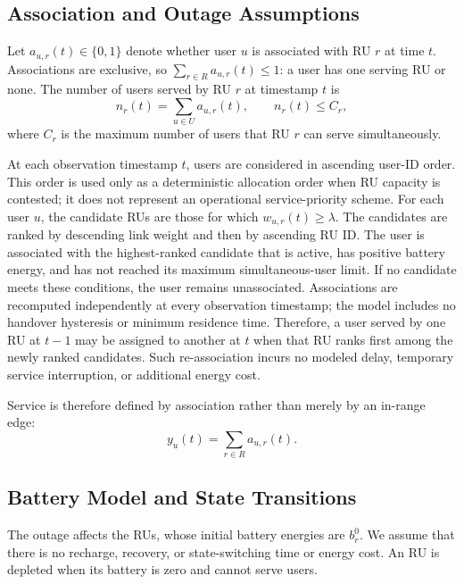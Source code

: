 \subsection{Association and Outage Assumptions}

Let \(a_{u,r}(t)\in\{0,1\}\) denote whether user \(u\) is associated with RU \(r\) at time \(t\). Associations are exclusive, so \(\sum_{r\in R}a_{u,r}(t)\leq1\): a user has one serving RU or none. The number of users served by RU \(r\) at timestamp \(t\) is
\begin{equation}
 n_r(t)=\sum_{u\in U}a_{u,r}(t), \qquad n_r(t)\leq C_r,
 \label{eq:ru-load}
\end{equation}
where \(C_r\) is the maximum number of users that RU \(r\) can serve simultaneously.

At each observation timestamp \(t\), users are considered in ascending user-ID order. This order is used only as a deterministic allocation order when RU capacity is contested; it does not represent an operational service-priority scheme. For each user \(u\), the candidate RUs are those for which \(w_{u,r}(t)\geq\lambda\). The candidates are ranked by descending link weight and then by ascending RU ID. The user is associated with the highest-ranked candidate that is active, has positive battery energy, and has not reached its maximum simultaneous-user limit. If no candidate meets these conditions, the user remains unassociated. Associations are recomputed independently at every observation timestamp; the model includes no handover hysteresis or minimum residence time. Therefore, a user served by one RU at \(t-1\) may be assigned to another at \(t\) when that RU ranks first among the newly ranked candidates. Such re-association incurs no modeled delay, temporary service interruption, or additional energy cost.

Service is therefore defined by association rather than merely by an in-range edge:
\begin{equation}
 y_u(t)=\sum_{r\in R}a_{u,r}(t).
\end{equation}

\subsection{Battery Model and State Transitions}
The outage affects the RUs, whose initial battery energies are \(b_r^0\). We assume that there is no recharge, recovery, or state-switching time or energy cost.  An RU is depleted when its battery is zero and cannot serve users.

